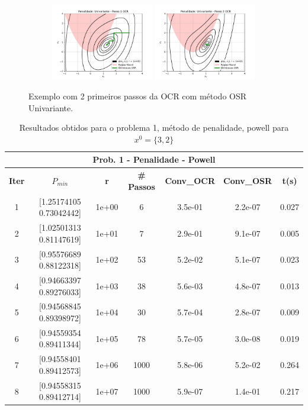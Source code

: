 \documentclass[10pt, a4paper]{article}
\begin{document}
\begin{figure}[H]
  \centering
  \begin{subfigure}[b]{\textwidth}
    \includegraphics[width=0.49\textwidth]{fig_p1/Penalidade_Univariante_1.pdf}
    \includegraphics[width=0.49\textwidth]{fig_p1/Penalidade_Univariante_2.pdf}
  \end{subfigure}
  \caption{Exemplo com 2 primeiros passos da OCR com método OSR Univariante. }
\end{figure}


\vspace{5mm}
\begin{table}[H]
  \begin{center}
    \begin{tabular}{c|c|c|c|c|c|c}
      \multicolumn{7}{c}{\textbf{Prob. 1 - Penalidade - Powell}}\\
      \hline
      \textbf{Iter} & \textbf{$P_{min}$} & \textbf{r} & \textbf{\# Passos} & \textbf{Conv\_OCR} & \textbf{Conv\_OSR} & \textbf{t(s)}\\
      \hline
        1& [1.25174105 0.73042442]& 1e+00& 6& 3.5e-01& 2.2e-07& 0.027     \\
        2& [1.02501313 0.81147619]& 1e+01& 7& 2.9e-01& 9.1e-07& 0.005\\
        3& [0.95576689 0.88122318]& 1e+02& 53& 5.2e-02& 5.1e-07& 0.023\\
        4& [0.94663397 0.89276033]& 1e+03& 38& 5.6e-03& 4.8e-07& 0.013\\
        5& [0.94568845 0.89398972]& 1e+04& 30& 5.7e-04& 2.8e-07& 0.009\\
        6& [0.94559354 0.89411344]& 1e+05& 78& 5.7e-05& 3.0e-08& 0.019\\
        7& [0.94558401 0.89412573]& 1e+06& 1000& 5.8e-06& 5.2e-02& 0.264\\
        8& [0.94558315 0.89412714]& 1e+07& 1000& 5.9e-07& 1.4e-01& 0.217\\
    \end{tabular}
  \end{center}
  \caption{Resultados obtidos para o problema 1, método de penalidade, powell para $x^0=\{3,2\}$}
\end{table}
\end{document}
